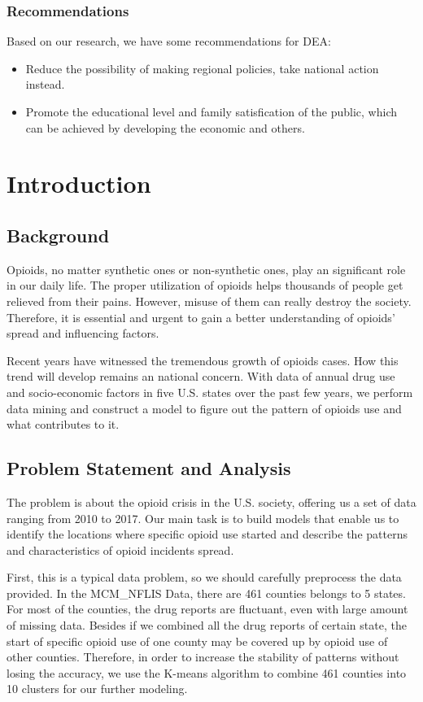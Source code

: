 \documentclass[12pt]{article}
\begin{document}
\subsubsection*{Recommendations}
Based on our research, we have some recommendations for DEA:
\begin{itemize}
	\item Reduce the possibility of making regional policies, take national action instead.
	\item Promote the educational level and family satisfication of the public, which can be achieved by developing the economic and others.
\end{itemize}
\newpage

\section{Introduction}
\subsection{Background}
Opioids, no matter synthetic ones or non-synthetic ones, play an significant role in our daily life. The proper utilization of opioids helps thousands of people get relieved from their pains. However, misuse of them can really destroy the society. Therefore, it is essential and urgent to gain a better understanding of opioids' spread and influencing factors.

Recent years have witnessed the tremendous growth of opioids cases. How this trend will develop remains an national concern. With data of annual drug use and socio-economic factors in five U.S. states over the past few years, we perform data mining and construct a model to figure out the pattern of opioids use and what contributes to it.

\subsection{Problem Statement and Analysis}
The problem is about the opioid crisis in the U.S. society, offering us a set of data ranging from 2010 to 2017. Our main task is to build models that enable us to identify the locations where specific opioid use started and describe the patterns and characteristics of opioid incidents spread. 

First, this is a typical data problem, so we should carefully preprocess the data provided. In the MCM\_NFLIS Data, there are 461 counties belongs to 5 states. For most of the counties, the drug reports are fluctuant, even with large amount of missing data. Besides if we combined all the drug reports of certain state, the start of specific opioid use of one county may be covered up by opioid use of other counties. Therefore, in order to increase the stability of patterns without losing the accuracy, we use the K-means algorithm to combine 461 counties into 10 clusters for our further modeling.
\end{document}
